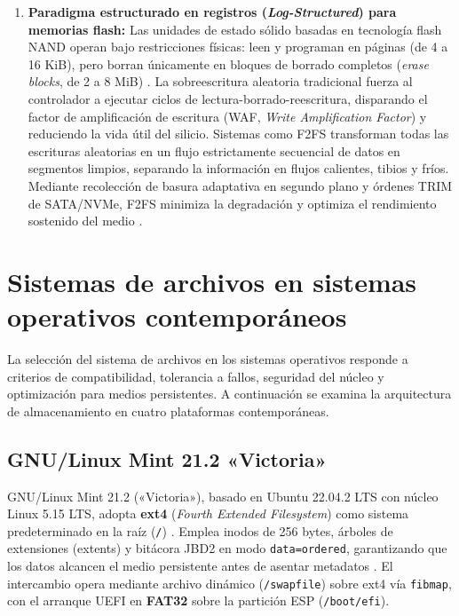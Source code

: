 \documentclass[12pt]{article}
\begin{document}
\begin{enumerate}[noitemsep, topsep=2pt]
    \item \textbf{Paradigma estructurado en registros (\textit{Log-Structured}) para memorias flash:} Las unidades de estado sólido basadas en tecnología flash NAND operan bajo restricciones físicas: leen y programan en páginas (de 4 a 16 KiB), pero borran únicamente en bloques de borrado completos (\textit{erase blocks}, de 2 a 8 MiB) \parencite{lee2015f2fs}. La sobreescritura aleatoria tradicional fuerza al controlador a ejecutar ciclos de lectura-borrado-reescritura, disparando el factor de amplificación de escritura (WAF, \textit{Write Amplification Factor}) y reduciendo la vida útil del silicio. Sistemas como F2FS transforman todas las escrituras aleatorias en un flujo estrictamente secuencial de datos en segmentos limpios, separando la información en flujos calientes, tibios y fríos. Mediante recolección de basura adaptativa en segundo plano y órdenes TRIM de SATA/NVMe, F2FS minimiza la degradación y optimiza el rendimiento sostenido del medio \parencite{lee2015f2fs}.
\end{enumerate}

\section{Sistemas de archivos en sistemas operativos contemporáneos}
\label{sec:sistemasArchivosContemporaneos}

La selección del sistema de archivos en los sistemas operativos responde a criterios de compatibilidad, tolerancia a fallos, seguridad del núcleo y optimización para medios persistentes. A continuación se examina la arquitectura de almacenamiento en cuatro plataformas contemporáneas.

\subsection{GNU/Linux Mint 21.2 «Victoria»}
\label{subsec:linuxMintVictoria}

GNU/Linux Mint 21.2 («Victoria»), basado en Ubuntu 22.04.2 LTS con núcleo Linux 5.15 LTS, adopta \textbf{ext4} (\textit{Fourth Extended Filesystem}) como sistema predeterminado en la raíz (\texttt{/}) \parencite{linuxmint2023victoria}. Emplea inodos de 256 bytes, árboles de extensiones (extents) y bitácora JBD2 en modo \texttt{data=ordered}, garantizando que los datos alcancen el medio persistente antes de asentar metadatos \parencite{kernel2024ext4}. El intercambio opera mediante archivo dinámico (\texttt{/swapfile}) sobre ext4 vía \texttt{fibmap}, con el arranque UEFI en \textbf{FAT32} sobre la partición ESP (\texttt{/boot/efi}).
\end{document}
